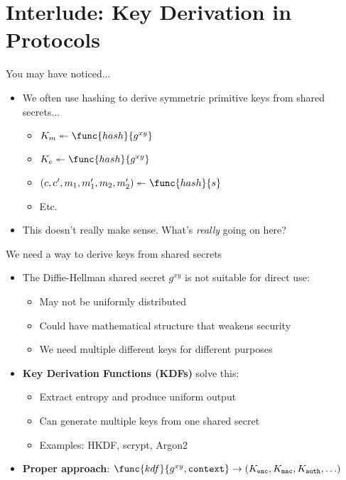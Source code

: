\documentclass[aspectratio=169, lualatex, handout]{beamer}
\begin{document}
\section{Interlude: Key Derivation in Protocols}

\begin{frame}{You may have noticed...}
	\begin{itemize}
		\item We often use hashing to derive symmetric primitive keys from shared secrets...
		      \begin{itemize}
			      \item $K_m \twoheadleftarrow \func{hash}{g^{xy}}$
			      \item $K_e \twoheadleftarrow \func{hash}{g^{xy}}$
			      \item $(c, c', m_{1}, m_{1}', m_{2}, m_{2}')  \twoheadleftarrow \func{hash}{s}$
			      \item Etc.
		      \end{itemize}
		\item This doesn't really make sense. What's \textit{really} going on here?
	\end{itemize}
\end{frame}

\begin{frame}{We need a way to derive keys from shared secrets}
	\begin{itemize}
		\item The Diffie-Hellman shared secret $g^{xy}$ is not suitable for direct use:
		      \begin{itemize}
			      \item May not be uniformly distributed
			      \item Could have mathematical structure that weakens security
			      \item We need multiple different keys for different purposes
		      \end{itemize}
		\item \textbf{Key Derivation Functions (KDFs)} solve this:
		      \begin{itemize}
			      \item Extract entropy and produce uniform output
			      \item Can generate multiple keys from one shared secret
			      \item Examples: HKDF, scrypt, Argon2
		      \end{itemize}
		\item \textbf{Proper approach}: $\func{kdf}{g^{xy}, \texttt{context}} \rightarrow (K_{\texttt{enc}}, K_{\texttt{mac}}, K_{\texttt{auth}}, \ldots)$
	\end{itemize}
\end{frame}
\end{document}
